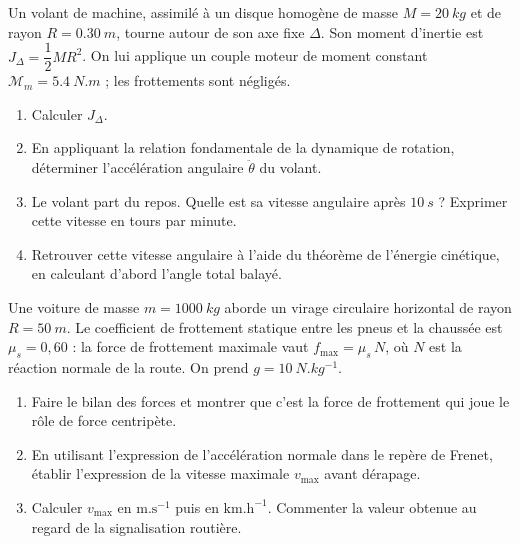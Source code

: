 \documentclass[11pt]{article}
\newcounter{popsec}
\newcounter{popsub}
\newcommand{\courssub}[1]{%
  \stepcounter{popsub}%
  \par\vspace{9pt}\noindent{\popxbold\fontsize{11.5}{13}\selectfont\color{popink}{\color{poporange}\thepopsec.\thepopsub}\hspace{6pt}#1}\par\nopagebreak\vspace{4pt}
}
\begin{document}
\begin{exercice}
Un volant de machine, assimilé à un disque homogène de masse $M = \SI{20}{kg}$ et de rayon $R = \SI{0,30}{m}$, tourne autour de son axe fixe $\Delta$. Son moment d'inertie est $J_\Delta = \dfrac{1}{2}MR^2$. On lui applique un couple moteur de moment constant $\mathcal{M}_m = \SI{5,4}{N.m}$ ; les frottements sont négligés.
\begin{enumerate}
\item Calculer $J_\Delta$.
\item En appliquant la relation fondamentale de la dynamique de rotation, déterminer l'accélération angulaire $\ddot{\theta}$ du volant.
\item Le volant part du repos. Quelle est sa vitesse angulaire après $\SI{10}{s}$ ? Exprimer cette vitesse en tours par minute.
\item Retrouver cette vitesse angulaire à l'aide du théorème de l'énergie cinétique, en calculant d'abord l'angle total balayé.
\end{enumerate}
\end{exercice}

\begin{exercice}
Une voiture de masse $m = \SI{1000}{kg}$ aborde un virage circulaire horizontal de rayon $R = \SI{50}{m}$. Le coefficient de frottement statique entre les pneus et la chaussée est $\mu_s = 0{,}60$ : la force de frottement maximale vaut $f_{\max} = \mu_s\,N$, où $N$ est la réaction normale de la route. On prend $g = \SI{10}{N.kg^{-1}}$.
\begin{enumerate}
\item Faire le bilan des forces et montrer que c'est la force de frottement qui joue le rôle de force centripète.
\item En utilisant l'expression de l'accélération normale dans le repère de Frenet, établir l'expression de la vitesse maximale $v_{\max}$ avant dérapage.
\item Calculer $v_{\max}$ en $\mathrm{m.s^{-1}}$ puis en $\mathrm{km.h^{-1}}$. Commenter la valeur obtenue au regard de la signalisation routière.
\end{enumerate}
\end{exercice}

\courssub{Je me prépare au Bac}
\end{document}
